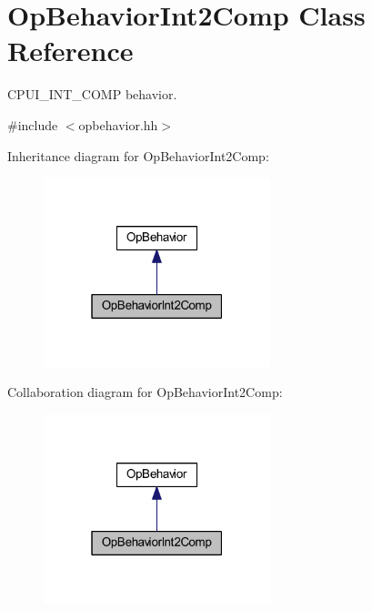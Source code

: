 \hypertarget{class_op_behavior_int2_comp}{}\section{Op\+Behavior\+Int2\+Comp Class Reference}
\label{class_op_behavior_int2_comp}


C\+P\+U\+I\+\_\+\+I\+N\+T\+\_\+C\+O\+MP behavior.  




{\ttfamily \#include $<$opbehavior.\+hh$>$}



Inheritance diagram for Op\+Behavior\+Int2\+Comp\+:
\nopagebreak
\begin{figure}[H]
\begin{center}
\leavevmode
\includegraphics[width=187pt]{class_op_behavior_int2_comp__inherit__graph}
\end{center}
\end{figure}


Collaboration diagram for Op\+Behavior\+Int2\+Comp\+:
\nopagebreak
\begin{figure}[H]
\begin{center}
\leavevmode
\includegraphics[width=187pt]{class_op_behavior_int2_comp__coll__graph}
\end{center}
\end{figure}
